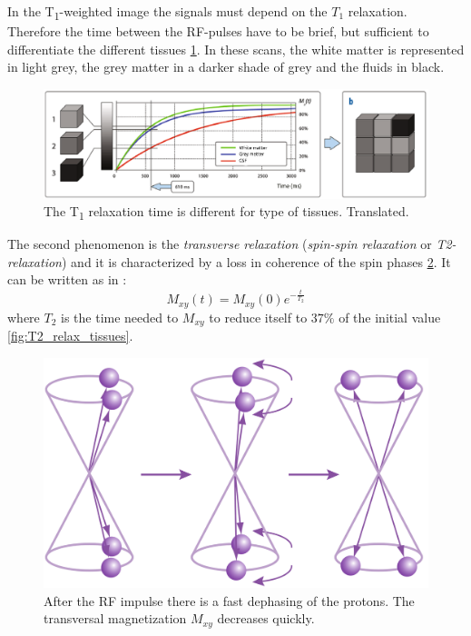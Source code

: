  \noindent In the T\textsubscript{1}-weighted image the signals must depend on the $T_1$ relaxation. Therefore the time between the RF-pulses have to be brief, but sufficient to differentiate the different tissues \ref{fig:T1_relax_tissues}. In these scans, the white matter is represented in light grey, the grey matter in a darker shade of grey and the fluids in black.

 \begin{figure}[h]
    \centering
    \includegraphics[width=1\textwidth]{images/t1_relax_tissues.png}
    \caption{The T\textsubscript{1} relaxation time is different for type of tissues. \cite{elementiRisonanza} Translated.}
    \label{fig:T1_relax_tissues}
 \end{figure}
 The second phenomenon is the \emph{transverse relaxation} (\emph{spin-spin relaxation} or \emph{T2-relaxation}) and it is characterized by a loss in coherence of the spin phases \ref{fig:T2_relax_phases}. It can be written as in \cite{slides}:
 \begin{equation}
    M_{xy}(t)=M_{xy}(0)e^{-\frac{t}{T_{2}}}
 \end{equation}
 where $T_2$ is the time needed to $M_{xy}$ to reduce itself to $37\%$ of the initial value \ref{fig:T2_relax_tissues}.

 \begin{figure}[h]
   \centering
   \begin{minipage}[c]{0.5\textwidth}
      \includegraphics[width=1\textwidth]{images/t2_relax_phases.png}
   \end{minipage}\hfill
   \begin{minipage}[b]{0.45\textwidth}
      \caption{After the RF impulse there is a fast dephasing of the protons. The transversal magnetization $M_{xy}$ decreases quickly. \cite{KastlerVetterIRM} }
      \label{fig:T2_relax_phases}
   \end{minipage}
\end{figure}
 
